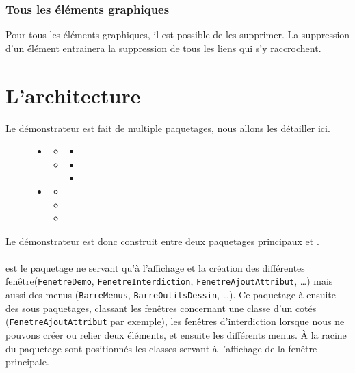 \documentclass[12pt,a4paper,oneside]{book}
\begin{document}
		\subsubsection{Tous les éléments graphiques}
		Pour tous les éléments graphiques, il est possible de les supprimer. La suppression d'un élément entrainera la suppression de tous les liens qui s'y raccrochent.

	\section{L'architecture}
	Le démonstrateur est fait de multiple paquetages, nous allons les détailler ici.
	\begin{figure}
	\begin{itemize}
		\item {}
			\begin{itemize}
				\item {}
					\begin{itemize}
						\item {}	
					\end{itemize}
				\item {}
					\begin{itemize}
						\item {}
						\item {}
					\end{itemize}
			\end{itemize}
		\item {}
			\begin{itemize}
				\item {}
				\item {}
				\item {}
			\end{itemize}
		\end{itemize}
	\end{figure}
	Le démonstrateur est donc construit entre deux paquetages principaux  et . 
	\paragraph{}	

	 est le paquetage ne servant qu'à l'affichage et la création des différentes fenêtre(\texttt{FenetreDemo}, \texttt{FenetreInterdiction}, \texttt{FenetreAjoutAttribut}, \ldots) mais aussi des menus (\texttt{BarreMenus}, \texttt{BarreOutilsDessin}, \ldots).
	Ce paquetage à ensuite des sous paquetages, classant les fenêtres concernant une classe d'un cotés (\texttt{FenetreAjoutAttribut} par exemple), les fenêtres d'interdiction
	lorsque nous ne pouvons créer ou relier deux éléments, et ensuite les différents menus. À la racine du paquetage  sont positionnés 
	les classes servant à l'affichage de la fenêtre principale.
\end{document}
